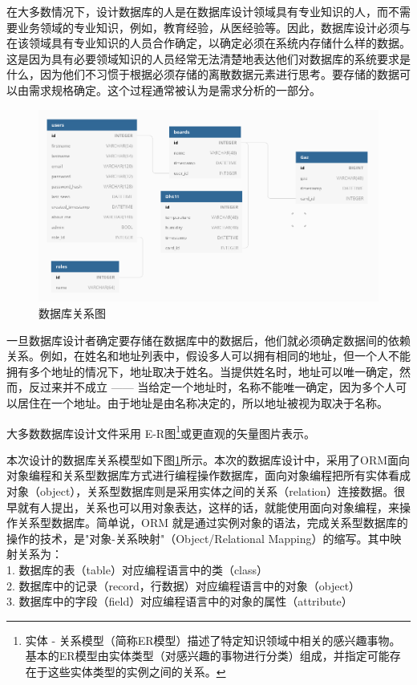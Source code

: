 在大多数情况下，设计数据库的人是在数据库设计领域具有专业知识的人，而不需要业务领域的专业知识，例如，教育经验，从医经验等。因此，数据库设计必须与在该领域具有专业知识的人员合作确定，以确定必须在系统内存储什么样的数据。这是因为具有必要领域知识的人员经常无法清楚地表达他们对数据库的系统要求是什么，因为他们不习惯于根据必须存储的离散数据元素进行思考。要存储的数据可以由需求规格确定。这个过程通常被认为是需求分析的一部分。

\begin{figure}[htbp]
	\centering
	\includegraphics[width=1\linewidth]{figure/2-7}
	\caption{数据库关系图}
	\label{fig:2-7}
\end{figure}

一旦数据库设计者确定要存储在数据库中的数据后，他们就必须确定数据间的依赖关系。例如，在姓名和地址列表中，假设多人可以拥有相同的地址，但一个人不能拥有多个地址的情况下，地址取决于姓名。当提供姓名时，地址可以唯一确定，然而，反过来并不成立 —— 当给定一个地址时，名称不能唯一确定，因为多个人可以居住在一个地址。由于地址是由名称决定的，所以地址被视为取决于名称。

大多数数据库设计文件采用 
E-R图\footnote{实体 - 关系模型（简称ER模型）描述了特定知识领域中相关的感兴趣事物。基本的ER模型由实体类型（对感兴趣的事物进行分类）组成，并指定可能存在于这些实体类型的实例之间的关系。}或更直观的矢量图片表示。

本次设计的数据库关系模型如下图\ref{fig:2-7}所示。本次的数据库设计中，采用了ORM面向对象编程和关系型数据库方式进行编程操作数据库，面向对象编程把所有实体看成对象（object），关系型数据库则是采用实体之间的关系（relation）连接数据。很早就有人提出，关系也可以用对象表达，这样的话，就能使用面向对象编程，来操作关系型数据库。简单说，ORM 就是通过实例对象的语法，完成关系型数据库的操作的技术，是"对象-关系映射"（Object/Relational Mapping）的缩写。其中映射关系为：
\\ 1. 数据库的表（table）对应编程语言中的类（class）
\\ 2. 数据库中的记录（record，行数据）对应编程语言中的对象（object） 
\\ 3. 数据库中的字段（field）对应编程语言中的对象的属性（attribute）

